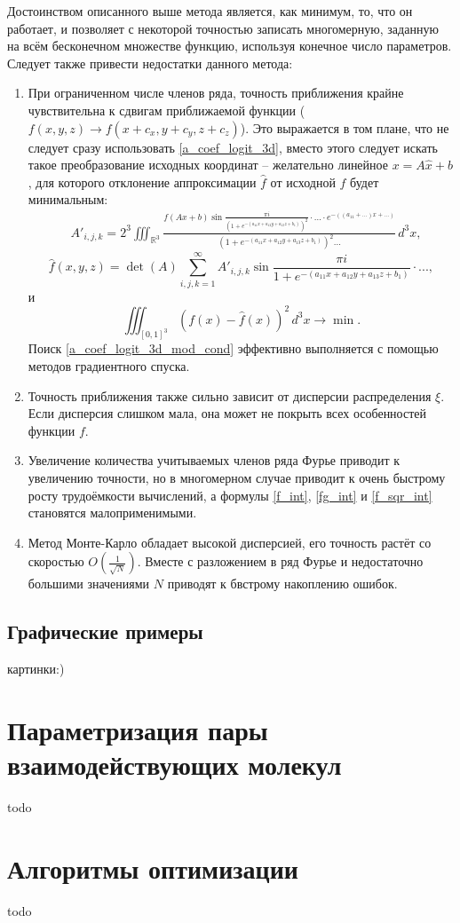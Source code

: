 Достоинством описанного выше метода является, как минимум, то, что он работает, и позволяет с некоторой точностью записать многомерную, заданную на всём бесконечном множестве функцию, используя конечное число параметров. Следует также привести недостатки данного метода:
\begin{enumerate}
\item При ограниченном числе членов ряда, точность приближения крайне чувствительна к сдвигам приближаемой функции ($f(x, y, z) \to f(x+c_x, y+c_y, z+c_z)$). Это выражается в том плане, что  не следует сразу использовать \ref{a_coef_logit_3d}, вместо этого следует искать такое преобразование исходных координат -- желательно линейное $x = A\hat{x} + b$, для которого отклонение аппроксимации $\hat{f}$ от исходной $f$ будет минимальным:
\begin{align}
	&A'_{i,j,k} = 2^3\iiint_{\mathbb{R}^3}\frac{f(Ax+b)\sin\frac{\pi i}{(1+e^{-(a_{11}x+a_{12}y+a_{13}z+b_1)})^2}\cdot...\cdot e^{-((a_{11}+...)x+...)}}{(1+e^{-(a_{11}x+a_{12}y+a_{13}z+b_1)})^2...}\, d^3x,
	\label{a_coef_logit_3d_mod}
\end{align}
\begin{equation}
	\hat{f}(x,y,z) = \det(A)\sum_{i,j,k=1}^\infty A'_{i,j,k}\sin{\frac{\pi i}{1 + e^{-(a_{11}x+a_{12}y+a_{13}z+b_1)}}}\cdot...,
	\label{logit_fourier_3d_mod}
\end{equation}
и
\begin{equation}
	\iiint_{{[0, 1]}^3}{(f(x) - \hat{f}(x))}^2\,d^3x \to \min.
	\label{a_coef_logit_3d_mod_cond}
\end{equation}
Поиск \ref{a_coef_logit_3d_mod_cond} эффективно выполняется с помощью методов градиентного спуска.

\item Точность приближения также сильно зависит от дисперсии распределения $\xi$. Если дисперсия слишком мала, она может не покрыть всех особенностей функции $f$.

\item Увеличение количества учитываемых членов ряда Фурье приводит к увеличению точности, но в многомерном случае приводит к очень быстрому росту трудоёмкости вычислений, а формулы \ref{f_int}, \ref{fg_int} и \ref{f_sqr_int} становятся малоприменимыми.

\item Метод Монте-Карло обладает высокой дисперсией, его точность растёт со скоростью $O(\frac{1}{\sqrt{N}})$. Вместе с разложением в ряд Фурье и недостаточно большими значениями $N$ приводят к бвстрому накоплению ошибок.
\end{enumerate}

\subsection{Графические примеры}
картинки:)

\section{Параметризация пары взаимодействующих молекул}
todo

\section{Алгоритмы оптимизации}
todo
